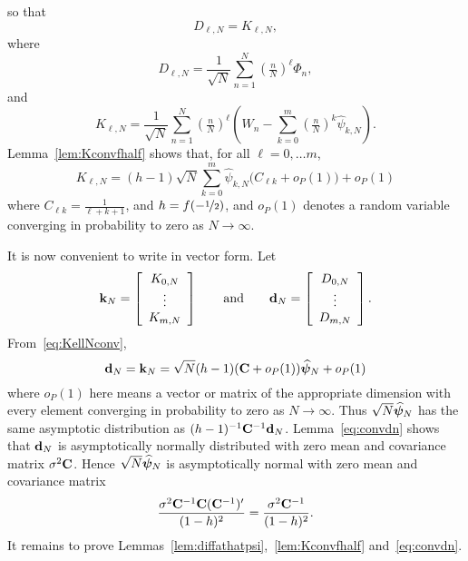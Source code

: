 \documentclass[journal]{IEEEtran}
\begin{document}
so that
\[
D_{\ell,N} = K_{\ell,N},
\]
where
\[
D_{\ell,N} = \frac{1}{\sqrt{N}} \sum_{n=1}^{N}(\tfrac{n}{N})^\ell \Phi_n,
\]
and
\begin{equation}\label{eq:KellN}
K_{\ell,N} = \frac{1}{\sqrt{N}}\sum_{n=1}^{N}(\tfrac{n}{N})^\ell\left(W_{n}- \sum_{k=0}^{m}(\tfrac{n}{N})^k \widehat{\psi}_{k,N}  \right).
\end{equation}
Lemma~\ref{lem:Kconvfhalf} shows that, for all $\ell = 0, \dots m$,
\begin{equation}\label{eq:KellNconv}
K_{\ell,N} =  (h - 1) \sqrt{N} \sum_{k=0}^{m}  \widehat{\psi}_{k,N} \big( C_{\ell k} + o_P(1) \big) + o_P(1)
\end{equation}
where $C_{\ell k} =  \tfrac{1}{\ell + k + 1}$, and $h = f(-\nicefrac{1}{2})$, and $o_P(1)$ denotes a random variable converging in probability to zero as $N\rightarrow\infty$.

It is now convenient to write in vector form.  Let 
\begin{equation}\label{eq:dnandkn}
\kbf_N = 
\left[
\begin{array}
[c]{c}%
K_{0,N}  \\ \vdots \\ K_{m,N}
\end{array}
\right]
\qquad \text{and} \qquad 
\dbf_N = \left[
\begin{array}
[c]{c}%
D_{0,N}  \\ \vdots \\ D_{m,N}
\end{array}
\right].
\end{equation}
From~\eqref{eq:KellNconv},
\[
\mathbf{d}_N = \mathbf{k}_N = \sqrt{N} (h - 1)(\mathbf{C} + o_P(1)) \widehat{\boldsymbol{\psi}}_N + o_P(1)
\]
where $o_P(1)$ here means a vector or matrix of the appropriate dimension with every element converging in probability to zero as $N\rightarrow\infty$.  Thus $\sqrt{N}\widehat{\boldsymbol{\psi}}_N$ has the same asymptotic distribution as $(h - 1)^{-1}\mathbf{C}^{-1} \mathbf{d}_N$.  Lemma~\ref{eq:convdn} shows that $\mathbf{d}_N$ is asymptotically normally distributed with zero mean and covariance matrix $\sigma^2\mathbf{C}$.  Hence $\sqrt{N}\widehat{\boldsymbol{\psi}}_N$ is asymptotically normal with zero mean and covariance matrix
\[
\frac{\sigma^2\mathbf{C}^{-1}\mathbf{C}(\mathbf{C}^{-1})^\prime}{(1 - h)^2} = 
\frac{\sigma^2\mathbf{C}^{-1}}{(1 - h)^2}.
\] 
It remains to prove Lemmas~\ref{lem:diffathatpsi},~\ref{lem:Kconvfhalf} and~\ref{eq:convdn}.
\end{document}
